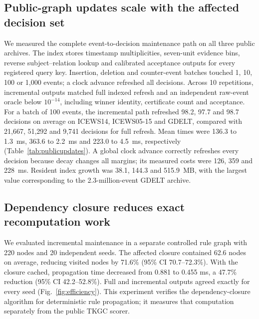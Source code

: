 \documentclass[preprint,12pt]{elsarticle}
\begin{document}
\subsection{Public-graph updates scale with the affected decision set}
We measured the complete event-to-decision maintenance path on all three public archives. The index stores timestamp multiplicities, seven-unit evidence bins, reverse subject--relation lookup and calibrated acceptance outputs for every registered query key. Insertion, deletion and counter-event batches touched 1, 10, 100 or 1,000 events; a clock advance refreshed all decisions. Across 10 repetitions, incremental outputs matched full indexed refresh and an independent raw-event oracle below $10^{-14}$, including winner identity, certificate count and acceptance. For a batch of 100 events, the incremental path refreshed 98.2, 97.7 and 98.7 decisions on average on ICEWS14, ICEWS05-15 and GDELT, compared with 21,667, 51,292 and 9,741 decisions for full refresh. Mean times were 136.3 to 1.3~ms, 363.6 to 2.2~ms and 223.0 to 4.5~ms, respectively (Table~\ref{tab:publicupdates}). A global clock advance correctly refreshes every decision because decay changes all margins; its measured costs were 126, 359 and 228~ms. Resident index growth was 38.1, 144.3 and 515.9~MB, with the largest value corresponding to the 2.3-million-event GDELT archive.

\begin{table}[!htbp]
\centering
\caption{End-to-end public-graph update maintenance. Means over 10 repetitions; full refresh re-evaluates every registered decision from the same indexed summaries.}
\label{tab:publicupdates}
\small
{}
\end{table}

\subsection{Dependency closure reduces exact recomputation work}
We evaluated incremental maintenance in a separate controlled rule graph with 220 nodes and 20 independent seeds. The affected closure contained 62.6 nodes on average, reducing visited nodes by 71.6\% (95\% CI 70.7--72.3\%). With the closure cached, propagation time decreased from 0.881 to 0.455 ms, a 47.7\% reduction (95\% CI 42.2--52.8\%). Full and incremental outputs agreed exactly for every seed (Fig.~\ref{fig:efficiency}). This experiment verifies the dependency-closure algorithm for deterministic rule propagation; it measures that computation separately from the public TKGC scorer.
\end{document}
